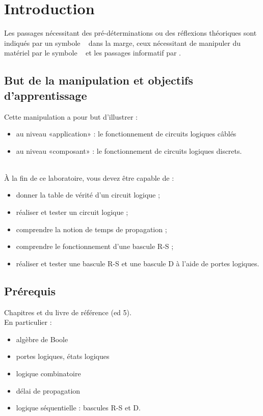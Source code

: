 \documentclass{../template/labo}
\author{The Fantastic Four}
\begin{document}

\section{Introduction}

Les passages nécessitant des pré-déterminations ou des réflexions théoriques sont indiqués par un symbole \faCogs~ dans la marge,
ceux nécessitant de manipuler du matériel par le symbole \faFlask~ et les passages informatif par \faLightbulbO.

\subsection{But de la manipulation et objectifs d'apprentissage}
Cette manipulation a pour but d'illustrer :
\begin{itemize}
\item au niveau «application» : le fonctionnement de circuits logiques câblés
\item au niveau «composant» : le fonctionnement de circuits logiques discrets.
\end{itemize}~\\

À la fin de ce laboratoire, vous devez être capable de :
\begin{itemize}
\item donner la table de vérité d'un circuit logique ;
\item réaliser et tester un circuit logique ;
\item comprendre la notion de temps de propagation ;
\item comprendre le fonctionnement d'une bascule R-S ;
\item réaliser et tester une bascule R-S et une bascule D à l'aide de portes logiques.
\end{itemize}

\subsection{Prérequis}
Chapitres  et   du livre de référence (ed 5).\\ En particulier :
\begin{itemize}
\item algèbre de Boole
\item portes logiques, états logiques
\item logique combinatoire
\item délai de propagation
\item logique séquentielle : bascules R-S et D.
\end{itemize}
\end{document}
